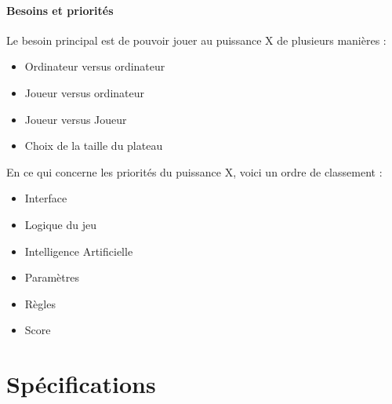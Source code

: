 \documentclass[a4paper,oneside]{article}
\begin{document}
\paragraph{Besoins et priorités\\}
Le besoin principal est de pouvoir jouer au puissance X de plusieurs manières :
\begin{itemize}
	\item Ordinateur versus ordinateur
	\item Joueur versus ordinateur
	\item Joueur versus Joueur
	\item Choix de la taille du plateau
\end{itemize}

En ce qui concerne les priorités du puissance X, voici  un ordre de classement :
\begin{itemize}
	\item Interface
	\item Logique du jeu
	\item Intelligence Artificielle
	\item Paramètres
	\item Règles
	\item Score
\end{itemize}



\newpage

\section{Spécifications}
\end{document}
